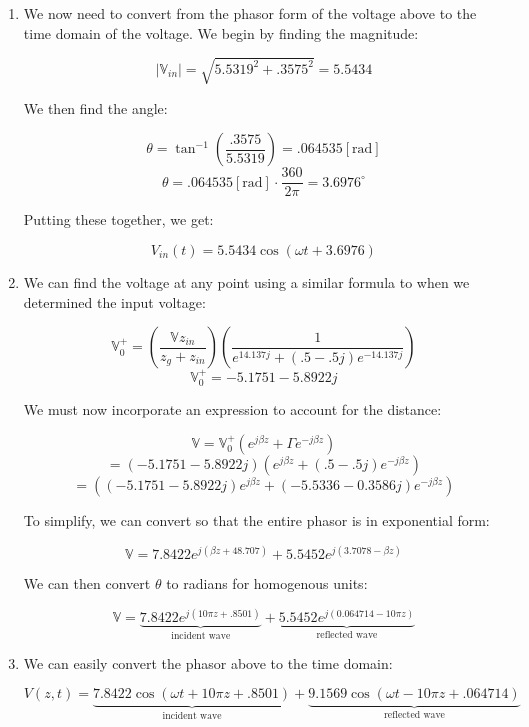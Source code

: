 \begin{enumerate}
\begin{enumerate}
      \item 

        We now need to convert from the phasor form of the voltage above to the time domain of the voltage. We begin by finding the magnitude:

        $$|\mathbb{V}_{in}|=\sqrt{5.5319^2+.3575^2}=5.5434$$

        We then find the angle:

        $$\theta=\tan^{-1}\left(\frac{.3575}{5.5319}\right)=.064535[\text{rad}]$$
        $$\theta=.064535[\text{rad}]\cdot\frac{360}{2\pi}=3.6976^{\circ}$$

        Putting these together, we get:

        $$\boxed{V_{in}(t)=5.5434\cos(\omega t+3.6976)}$$

      \item 

        We can find the voltage at any point using a similar formula to when we determined the input voltage:

        $$\mathbb{V}_0^+=\left( \frac{\mathbb{V}z_{in}}{z_g+z_{in}} \right)\left( \frac{1}{e^{14.137j}+(.5-.5j)e^{-14.137j}} \right)$$
        $$\mathbb{V}_0^+=-5.1751 - 5.8922j$$

        We must now incorporate an expression to account for the distance:

        $$\mathbb{V}=\mathbb{V}_0^+\left( e^{j\beta z}+\Gamma e^{-j\beta z} \right)$$
        $$=(-5.1751 - 5.8922j)\left( e^{j\beta z}+(.5-.5j)e^{-j\beta z} \right)$$
        $$=\left( (-5.1751 - 5.8922j)e^{j\beta z}+(-5.5336 - 0.3586j)e^{-j\beta z} \right)$$

        To simplify, we can convert so that the entire phasor is in exponential form:

        $$\mathbb{V}=7.8422e^{j(\beta z+48.707)}+5.5452e^{j(3.7078-\beta z)}$$

        We can then convert $\theta$ to radians for homogenous units:

        $$\boxed{\mathbb{V}=\underbrace{7.8422e^{j(10\pi z+.8501)}}_{\text{incident wave}}+\underbrace{5.5452e^{j(0.064714-10\pi z)}}_{\text{reflected wave}}}$$

      \item 

        We can easily convert the phasor above to the time domain:

        $$\boxed{V(z,t)=\underbrace{7.8422\cos(\omega t+10\pi z+.8501)}_{\text{incident wave}}+\underbrace{9.1569\cos(\omega t-10\pi z+.064714)}_{\text{reflected wave}}}$$


\end{enumerate}
\end{enumerate}
